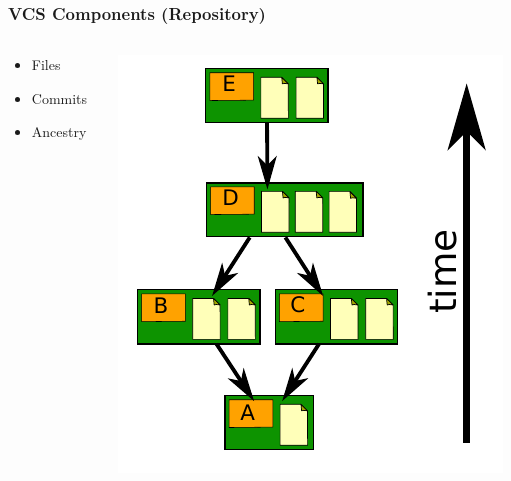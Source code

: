 \documentclass[english,compress]{beamer}
\begin{document}
\frame
{
    \frametitle{VCS Components (Repository)}

    \begin{columns}
        \begin{column}{.5\textwidth}
    \begin{itemize}
        \item Files
        \item Commits
        \item Ancestry
    \end{itemize}
\end{column}
\begin{column}{.5\textwidth}
    \includegraphics[width=.8\textwidth]{figs/repo.png}
\end{column}
\end{columns}
}
\end{document}
